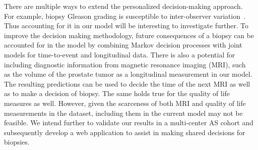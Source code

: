 There are multiple ways to extend the personalized decision-making approach. For example, biopsy Gleason grading is susceptible to inter-observer variation~\citep{coley2017}. Thus accounting for it in our model will be interesting to investigate further. To improve the decision making methodology, future consequences of a biopsy can be accounted for in the model by combining Markov decision processes with joint models for time-to-event and longitudinal data. There is also a potential for including diagnostic information from magnetic resonance imaging (MRI), such as the volume of the prostate tumor as a longitudinal measurement in our model. The resulting predictions can be used to decide the time of the next MRI as well as to make a decision of biopsy. The same holds true for the quality of life measures as well. However, given the scarceness of both MRI and quality of life measurements in the dataset, including them in the current model may not be feasible. We intend further to validate our results in a multi-center AS cohort and subsequently develop a web application to assist in making shared decisions for biopsies.